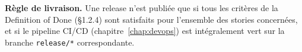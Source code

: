 \begin{encadre}
\textbf{Règle de livraison.} Une release n'est publiée que si tous les
critères de la Definition of Done (\S1.2.4) sont satisfaits pour l'ensemble
des stories concernées, et si le pipeline CI/CD (chapitre~\ref{chap:devops})
est intégralement vert sur la branche \texttt{release/*} correspondante.
\end{encadre}
